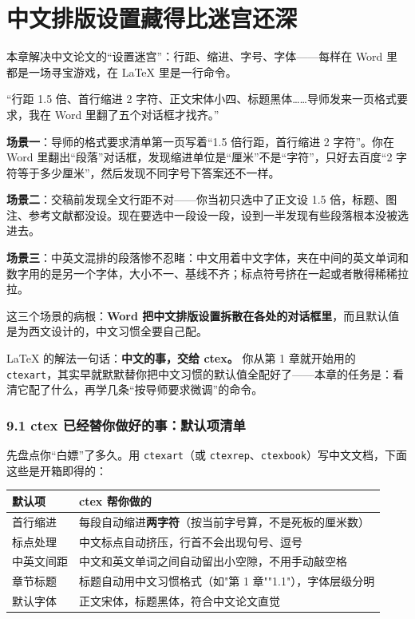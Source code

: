 \chapter{中文排版设置藏得比迷宫还深}

\begin{notebox}
本章解决中文论文的“设置迷宫”：行距、缩进、字号、字体——每样在 Word 里都是一场寻宝游戏，在 LaTeX 里是一行命令。
\end{notebox}


“行距 1.5 倍、首行缩进 2 字符、正文宋体小四、标题黑体……导师发来一页格式要求，我在 Word 里翻了五个对话框才找齐。”


\textbf{场景一}：导师的格式要求清单第一页写着“1.5 倍行距，首行缩进 2 字符”。你在 Word 里翻出“段落”对话框，发现缩进单位是“厘米”不是“字符”，只好去百度“2 字符等于多少厘米”，然后发现不同字号下答案还不一样。

\textbf{场景二}：交稿前发现全文行距不对——你当初只选中了正文设 1.5 倍，标题、图注、参考文献都没设。现在要选中一段设一段，设到一半发现有些段落根本没被选进去。

\textbf{场景三}：中英文混排的段落惨不忍睹：中文用着中文字体，夹在中间的英文单词和数字用的是另一个字体，大小不一、基线不齐；标点符号挤在一起或者散得稀稀拉拉。

这三个场景的病根：\textbf{Word 把中文排版设置拆散在各处的对话框里}，而且默认值是为西文设计的，中文习惯全要自己配。

LaTeX 的解法一句话：\textbf{中文的事，交给 ctex。} 你从第 1 章就开始用的 \texttt{ctexart}，其实早就默默替你把中文习惯的默认值全配好了——本章的任务是：看清它配了什么，再学几条“按导师要求微调”的命令。


\subsection*{9.1 ctex 已经替你做好的事：默认项清单}

先盘点你“白嫖”了多久。用 \texttt{ctexart}（或 \texttt{ctexrep}、\texttt{ctexbook}）写中文文档，下面这些是开箱即得的：

\begin{table}[htbp]
\centering
\small
\begin{tabularx}{\linewidth}{@{}*{2}{>{\raggedright\arraybackslash}X}@{}}
\toprule
\textbf{默认项} & \textbf{ctex 帮你做的} \\
\midrule
首行缩进 & 每段自动缩进\textbf{两字符}（按当前字号算，不是死板的厘米数） \\
标点处理 & 中文标点自动挤压，行首不会出现句号、逗号 \\
中英文间距 & 中文和英文单词之间自动留出小空隙，不用手动敲空格 \\
章节标题 & 标题自动用中文习惯格式（如"第 1 章""1.1"），字体层级分明 \\
默认字体 & 正文宋体，标题黑体，符合中文论文直觉 \\
\bottomrule
\end{tabularx}
\end{table}

